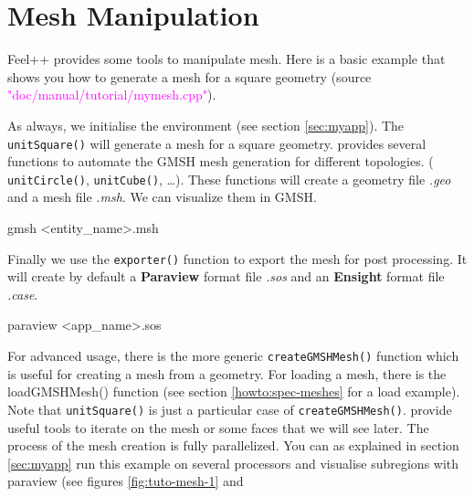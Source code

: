 %


\section{Mesh Manipulation}
\label{sec:mymesh}

Feel++ provides some tools to manipulate mesh. 
Here is a basic example that shows
you how to generate a mesh for a square geometry
(source \textcolor{magenta}{"doc/manual/tutorial/mymesh.cpp"}).
%
\vspace{2mm}

\vspace{2mm}

As always, we initialise the \feel environment (see section \ref{sec:myapp}).
The \lstinline!unitSquare()! will generate a mesh for a square geometry.
\feel provides several functions to automate the GMSH mesh generation
for different topologies.
%
( \lstinline!unitCircle()!,
  \lstinline!unitCube()!,
  \dots ).
%
These functions will create a geometry file
\textit{.geo} and a mesh file \textit{.msh}. We can visualize them in GMSH. 
%
\begin{unixcom}
    gmsh <entity_name>.msh
\end{unixcom}
%
Finally we use the \lstinline!exporter()! function to export the mesh for post processing.
It will create by default a \textbf{Paraview} format file \textit{.sos} and an \textbf{Ensight}
format file \textit{.case}.
%
\begin{unixcom}
    paraview <app_name>.sos
\end{unixcom}
%
For advanced usage, there is the more generic \lstinline!createGMSHMesh()! function which is
useful for creating a mesh from a geometry. For loading a mesh, there is the loadGMSHMesh() function
(see section \ref{howto:spec-meshes} for a load example).
Note that \lstinline!unitSquare()! is just a particular case of \lstinline!createGMSHMesh()!.
\feel provide useful tools to iterate on the mesh or some faces that we will see later.
%
The process of the mesh creation is fully parallelized. You can as explained in section \ref{sec:myapp}
run this example on several processors and visualise subregions with paraview (see figures 
\ref{fig:tuto-mesh-1} and

\begin{figure}[!h]
\centering
{}
\end{figure}
\label{fig:tuto_mesh-1}


